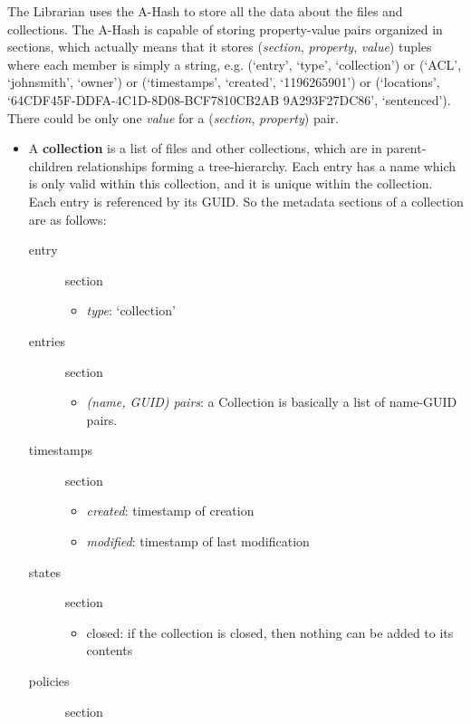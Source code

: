\documentclass{book}
\begin{document}
The Librarian uses the A-Hash to store all the data about the files and collections. The A-Hash is capable of storing property-value pairs organized in sections, which actually means that it stores (\emph{section}, \emph{property}, \emph{value}) tuples where each member is simply a string, e.g. (`entry', `type', `collection') or (`ACL', `johnsmith', `owner') or (`timestamps', `created', `1196265901') or (`locations', `64CDF45F-DDFA-4C1D-8D08-BCF7810CB2AB 9A293F27DC86', `sentenced'). There could be only one \emph{value} for a (\emph{section}, \emph{property}) pair.

\begin{itemize}
    \item A \textbf{collection} is a list of files and other collections, which are in parent-children relationships forming a tree-hierarchy. Each entry has a name which is only valid within this collection, and it is unique within the collection. Each entry is referenced by its GUID. So the metadata sections of a collection are as follows: 
    \begin{description}
        \item [entry] section 
        \begin{itemize}
            \item \emph{type}: `collection' 
        \end{itemize}
        \item [entries] section 
        \begin{itemize}
            \item \emph{(name, GUID) pairs}: a Collection is basically a list of name-GUID pairs. 
        \end{itemize}
        \item [timestamps] section 
        \begin{itemize}
            \item \emph{created}: timestamp of creation 
            \item \emph{modified}: timestamp of last modification 
        \end{itemize}
        \item [states] section 
        \begin{itemize}
            \item closed: if the collection is closed, then nothing can be added to its contents 
        \end{itemize}
        \item [policies] section 
        \begin{itemize}

\end{itemize}
\end{description}
\end{itemize}
\end{document}
